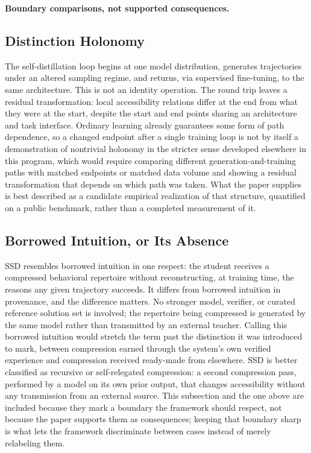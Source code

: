 \documentclass[11pt]{article}
\begin{document}
\textbf{Boundary comparisons, not supported consequences.}

\subsection{Distinction Holonomy}

The self-distillation loop begins at one model distribution, generates trajectories under an altered sampling regime, and returns, via supervised fine-tuning, to the same architecture. This is not an identity operation. The round trip leaves a residual transformation: local accessibility relations differ at the end from what they were at the start, despite the start and end points sharing an architecture and task interface. Ordinary learning already guarantees some form of path dependence, so a changed endpoint after a single training loop is not by itself a demonstration of nontrivial holonomy in the stricter sense developed elsewhere in this program, which would require comparing different generation-and-training paths with matched endpoints or matched data volume and showing a residual transformation that depends on which path was taken. What the paper supplies is best described as a candidate empirical realization of that structure, quantified on a public benchmark, rather than a completed measurement of it.

\subsection{Borrowed Intuition, or Its Absence}

SSD resembles borrowed intuition in one respect: the student receives a compressed behavioral repertoire without reconstructing, at training time, the reasons any given trajectory succeeds. It differs from borrowed intuition in provenance, and the difference matters. No stronger model, verifier, or curated reference solution set is involved; the repertoire being compressed is generated by the same model rather than transmitted by an external teacher. Calling this borrowed intuition would stretch the term past the distinction it was introduced to mark, between compression earned through the system's own verified experience and compression received ready-made from elsewhere. SSD is better classified as recursive or self-relegated compression: a second compression pass, performed by a model on its own prior output, that changes accessibility without any transmission from an external source. This subsection and the one above are included because they mark a boundary the framework should respect, not because the paper supports them as consequences; keeping that boundary sharp is what lets the framework discriminate between cases instead of merely relabeling them.
\end{document}
